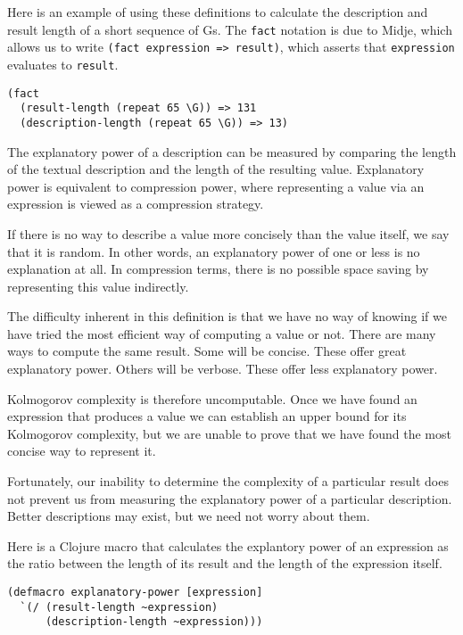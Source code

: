 \documentclass[numbers]{sigplanconf}
\begin{document}
Here is an example of using these definitions to calculate the description and result length of a short sequence of Gs.
The \verb|fact| notation is due to Midje, which allows us to write \verb|(fact expression => result)|,
which asserts that \verb|expression| evaluates to \verb|result|.

\begin{verbatim}
(fact
  (result-length (repeat 65 \G)) => 131
  (description-length (repeat 65 \G)) => 13)
\end{verbatim}

The explanatory power of a description can be measured by comparing the length of the textual description and the length
of the resulting value. Explanatory power is equivalent to compression power, where representing a value via an
expression is viewed as a compression strategy.

If there is no way to describe a value more concisely than the value itself, we say that it is random. In other words, an
explanatory power of one or less is no explanation at all. In compression terms, there is no possible space saving
by representing this value indirectly.

The difficulty inherent in this definition is that we have no way of knowing if we have tried the most efficient way of
computing a value or not. There are many ways to compute the same result. Some will be concise. These offer great
explanatory power. Others will be verbose. These offer less explanatory power.

Kolmogorov complexity is therefore uncomputable. Once we have found an expression that produces a value we can establish
an upper bound for its Kolmogorov complexity, but we are unable to prove that we have found the most concise way to
represent it.

Fortunately, our inability to determine the complexity of a particular result does not prevent us from measuring the
explanatory power of a particular description. Better descriptions may exist, but we need not worry about them.

Here is a Clojure macro that calculates the explantory power of an expression as the ratio between the length of its
result and the length of the expression itself.

\begin{verbatim}
(defmacro explanatory-power [expression]
  `(/ (result-length ~expression)
      (description-length ~expression)))
\end{verbatim}
\end{document}
